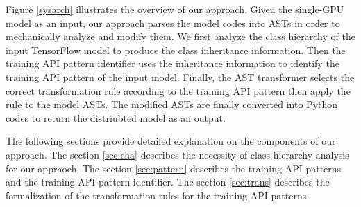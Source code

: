 Figure \ref{sysarch} illustrates the overview of our approach.
Given the single-GPU model as an input, our approach parses the model codes
into ASTs in order to mechanically analyze and modify them.
We first analyze the class hierarchy of the input TensorFlow model
to produce the class inheritance information.
Then the training API pattern identifier uses the inheritance information to
identify the training API pattern of the input model.
Finally, the AST transformer selects the correct transformation rule
according to the training API pattern then apply the rule to the model ASTs.
The modified ASTs are finally converted into Python codes to return
the distriubted model as an output.

The following sections provide detailed explanation on the components of our
approach. The section \ref{sec:cha} describes the
necessity of class hierarchy analysis for our appraoch.
The section \ref{sec:pattern} describes the training API patterns and the
training API pattern identifier. The section \ref{sec:trans} describes the
formalization of the transformation rules for the training API patterns.

